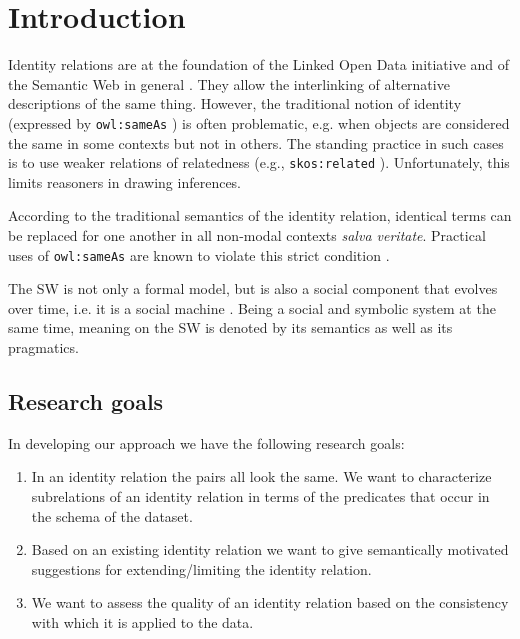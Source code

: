\section{Introduction}
\label{sec:introduction}

Identity relations are at the foundation of the Linked Open Data initiative
  and of the Semantic Web in general \cite{BizerCyganiakHeath2007}.
They allow the interlinking of alternative descriptions of the same thing.
However, the traditional notion of identity
  (expressed by
  {\small \texttt{owl:sameAs}} \cite{MotikPaterschneiderGrau2012})
  is often problematic, e.g. when objects are considered the same in some
  contexts but not in others.
The standing practice in such cases is to use weaker relations of relatedness
  (e.g., {\small \texttt{skos:related}} \cite{MilesBechhofer2009}).
Unfortunately, this limits reasoners in drawing inferences.

According to the traditional semantics of the identity relation,
  identical terms can be replaced for one another in all non-modal contexts
  \emph{salva veritate}.
Practical uses of {\small \texttt{owl:sameAs}} are known to violate this
  strict condition
  \cite{HalpinHayes2010,HalpinHayesMccuskerMcguinnessThompson2010}.

The SW is not only a formal model,
  but is also a social component that evolves over time,
  i.e. it is a social machine \cite{Www2013}.
Being a social and symbolic system at the same time,
  meaning on the SW is denoted by its semantics as well as its pragmatics.

\subsection{Research goals}
\label{sec:research_goals}

In developing our approach we have the following research goals:
\begin{enumerate}
\item In an identity relation the pairs all look the same.
      We want to characterize subrelations of an identity relation in terms
      of the predicates that occur in the schema of the dataset.
\item Based on an existing identity relation we want to give semantically
      motivated suggestions for extending/limiting the identity relation.
\item We want to assess the quality of an identity relation based on
      the consistency with which it is applied to the data.
\end{enumerate}

